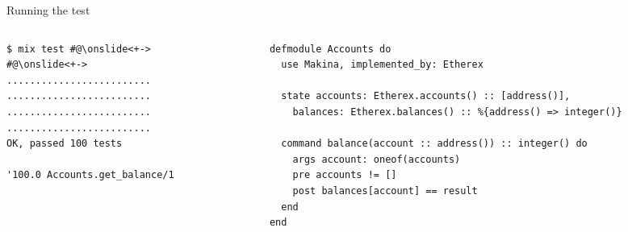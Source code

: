 \documentclass[aspectratio=169, 10pt, handout]{beamer}
\begin{document}
\begin{frame}[label={sec:org2b4aa8b},fragile]{Running the test}
 \begin{columns}
\begin{column}{0.28\columnwidth}
\lstset{language=bash,label= ,caption= ,captionpos=b,numbers=none,style=shell}
\begin{lstlisting}
$ mix test #@\onslide<+->
#@\onslide<+->
.........................
.........................
.........................
.........................
OK, passed 100 tests

'100.0 Accounts.get_balance/1
\end{lstlisting}
\end{column}

\begin{column}{0.58\columnwidth}
\lstset{language=elixir,label= ,caption= ,captionpos=b,numbers=none,style=display}
\begin{lstlisting}
defmodule Accounts do
  use Makina, implemented_by: Etherex

  state accounts: Etherex.accounts() :: [address()],
	balances: Etherex.balances() :: %{address() => integer()}

  command balance(account :: address()) :: integer() do
    args account: oneof(accounts)
    pre accounts != []
    post balances[account] == result
  end
end
\end{lstlisting}
\end{column}
\end{columns}
\end{frame}
\end{document}
